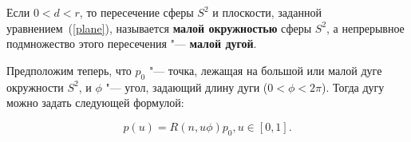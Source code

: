 \begin{definition}
Если $0<d<r$, то пересечение сферы $S^2$ и плоскости, заданной уравнением~(\ref{plane}), называется \textbf{малой
окружностью} сферы $S^2$, а непрерывное подмножество этого пересечения "--- \textbf{малой дугой}.
\end{definition}

Предположим теперь, что $p_0$ "--- точка, лежащая на большой или малой дуге окружности $S^2$, и $\phi$ "--- угол,
задающий длину дуги ($0 < \phi < 2\pi$). Тогда дугу можно задать следующей формулой:

$$
p(u)=R(n,u\phi)p_0, u \in [0,1].
$$
